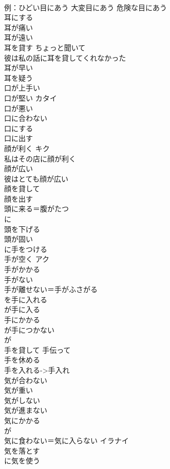 \documentclass[8pt]{extreport}
\begin{document}
\begin{CJK}{UTF8}{min}
\\	例：ひどい目にあう 大変目にあう 危険な目にあう
\\	耳にする	
\\	耳が痛い	
\\	耳が遠い	
\\	耳を貸す	ちょっと聞いて 
\\	彼は私の話に耳を貸してくれなかった
\\	耳が早い	
\\	耳を疑う	
\\	口が上手い	
\\	口が堅い	カタイ 
\\	口が悪い	
\\	口に合わない	
\\	口にする	
\\	口に出す	
\\	顔が利く	キク 
\\	私はその店に顔が利く
\\	顔が広い	
\\	彼はとても顔が広い
\\	顔を貸して	
\\	顔を出す	
\\	頭に来る＝腹がたつ	
\\	に
\\	頭を下げる	
\\	頭が固い	
\\	に手をつける	
\\	手が空く	アク 
\\	手がかかる	
\\	手がない	
\\	手が離せない＝手がふさがる	
\\	を手に入れる 
\\	が手に入る	
\\	手にかかる	
\\	が手につかない	
\\	が
\\	手を貸して	手伝って
\\	手を休める	
\\	手を入れる->手入れ	
\\	気が合わない	
\\	気が重い	
\\	気がしない	
\\	気が進まない	
\\	気にかかる	
\\	が
\\	気に食わない＝気に入らない	イラナイ 
\\	気を落とす	
\\	に気を使う	

\end{CJK}
\end{document}
